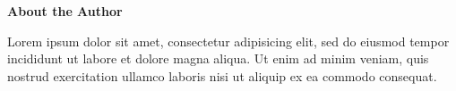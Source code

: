 
\clearpage
\begin{adjustwidth}{0.1\textwidth}{0.1\textwidth}
\begingroup
\null\vspace{0.2\textheight}
\begin{center}
{\bfseries\Large About the Author}\par\vspace{2em}

Lorem ipsum dolor sit amet, consectetur adipisicing elit, sed do eiusmod tempor incididunt ut labore et dolore magna aliqua. Ut enim ad minim veniam, quis nostrud exercitation ullamco laboris nisi ut aliquip ex ea commodo consequat.
\end{center}
\endgroup
\end{adjustwidth}
\clearpage